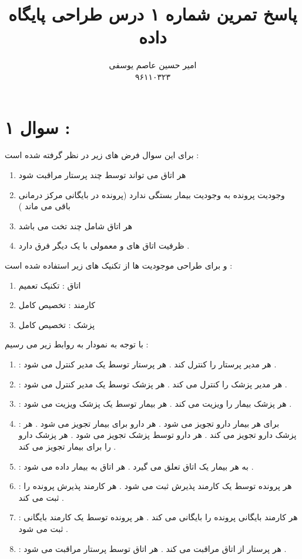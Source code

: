 \documentclass{article}
\title{پاسخ تمرین شماره ۱ درس طراحی پایگاه داده }
\author{امیر حسین عاصم یوسفی \\ ۹۶۱۱۰۳۲۳}
\begin{document}
	\maketitle
	\section*{سوال ۱  : }
	برای این سوال فرض های زیر در نظر گرفته شده است  ‌: 
	\begin{center}
		\begin{enumerate}
			\item هر اتاق می تواند توسط چند پرستار مراقبت شود 
			\item وجودیت پرونده به وجودیت بیمار بستگی ندارد (پرونده در بایگانی مرکز درمانی باقی می ماند )
			\item هر اتاق شامل چند تخت می باشد  
			\item ظرفیت اتاق های 
			و معمولی با یک دیگر فرق دارد  . 
		\end{enumerate}
	\end{center}
و برای طراحی موجودیت ها از تکنیک های زیر استفاده شده است   : 
\begin{center}
	\begin{enumerate}
		\item اتاق  : تکنیک تعمیم
		\item کارمند  : تخصیص کامل 
		\item پزشک  : تخصیص کامل 
	\end{enumerate}
\end{center}
با توجه به نمودار 
به روابط زیر می رسیم  : 
\begin{center}
	\begin{enumerate}
		\item 	\textcolor{red}{}  : هر مدیر  
		پرستار را کنترل کند  . هر پرستار توسط یک مدیر کنترل می شود . 
		\item \textcolor{red}{} : هر مدیر 
		پزشک را کنترل می کند . هر پزشک توسط یک مدیر کنترل می شود  . 
		\item \textcolor{red}{} : هر پزشک 
		بیمار را ویزیت می کند .  هر بیمار توسط یک پزشک ویزیت می شود  . 
		\item \textcolor{red}{} : برای هر بیمار 
		دارو تجویز می شود  . هر دارو برای 
		بیمار تجویز می شود . هر پزشک 
		دارو تجویز می کند . هر دارو توسط 
		پزشک تجویز می شود . 
		هر پزشک 
		دارو را برای 
		بیمار تجویز می کند . 
		\item \textcolor{red}{}  : به هر بیمار یک اتاق تعلق می گیرد  . هر اتاق به 
		بیمار داده می شود  . 
		\item \textcolor{red}{} : هر پرونده توسط یک کارمند پذیرش ثبت می شود . هر کارمند پذیرش 
		پرونده را ثبت می کند . 
		\item \textcolor{red}{} : هر کارمند بایگانی 
		پرونده را بایگانی می کند . هر پرونده توسط یک کارمند بایگانی ثبت می شود  . 
		\item \textcolor{red}{} : هر پرستار از 
		اتاق مراقبت می کند . هر اتاق توسط 
		پرستار مراقبت می شود . 
	\end{enumerate}

\end{center}
\end{document}
